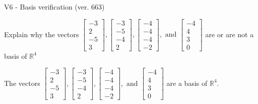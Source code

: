 \begin{exercise}
  \begin{exerciseTitle}V6 - Basis verification (ver. 663)\end{exerciseTitle}
  \begin{exerciseStatement}
    Explain why the vectors \(\left[\begin{array}{r}
-3 \\
2 \\
-5 \\
3
\end{array}\right] , \left[\begin{array}{r}
-3 \\
-5 \\
-4 \\
2
\end{array}\right] , \left[\begin{array}{r}
-4 \\
-4 \\
-4 \\
-2
\end{array}\right] , \text{ and } \left[\begin{array}{r}
-4 \\
4 \\
3 \\
0
\end{array}\right]\) are or are not a basis of \(\mathbb{R}^4\)	


  \end{exerciseStatement}
  \begin{exerciseAnswer}
   The vectors \(\left[\begin{array}{r}
-3 \\
2 \\
-5 \\
3
\end{array}\right] , \left[\begin{array}{r}
-3 \\
-5 \\
-4 \\
2
\end{array}\right] , \left[\begin{array}{r}
-4 \\
-4 \\
-4 \\
-2
\end{array}\right] , \text{ and } \left[\begin{array}{r}
-4 \\
4 \\
3 \\
0
\end{array}\right]\) 
  	 are  a basis of \(\mathbb{R}^4\).
  


  \end{exerciseAnswer}
\end{exercise}